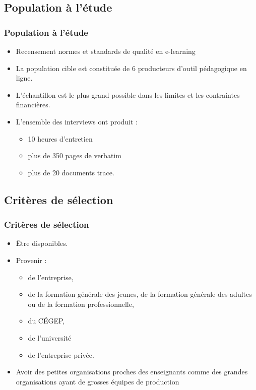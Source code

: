                      	\subsection{Population à l’étude} 
					\begin{frame}[allowframebreaks]
						\frametitle{Population à l’étude}
                        
                        			\begin{itemize} 
                       				 \item Recensement normes et standards de qualité en e-learning
                       		              \item La population cible est constituée de 6 producteurs d’outil pédagogique en ligne. 										 \item L’échantillon est le plus grand possible dans les limites et les contraintes financières. 
                       		              \item L’ensemble des interviews ont produit : 
                       		              \begin{itemize} 
                       		              	\item 10 heures d’entretien
                       		              	\item plus de 350 pages de verbatim
                       		              	\item plus de 20 documents trace.
                       		              \end{itemize}
                       		 \end{itemize}
                       		 \end{frame}
				\subsection{Critères de sélection} 
					\begin{frame}[allowframebreaks]
						\frametitle{Critères de sélection}
                        
                        			\begin{itemize} 
                       				\item Être disponibles.
							\item Provenir :
							\begin{itemize}
								\item de l’entreprise, 
								\item de la formation générale des jeunes, de la formation générale des adultes ou de la formation professionnelle, 
								\item du CÉGEP, 
								\item de l’université 
								\item de l’entreprise privée.
							\end{itemize}
							\item Avoir des petites organisations proches des enseignants comme des grandes organisations ayant de grosses équipes de production
                       		 \end{itemize}
                       		 \end{frame}
